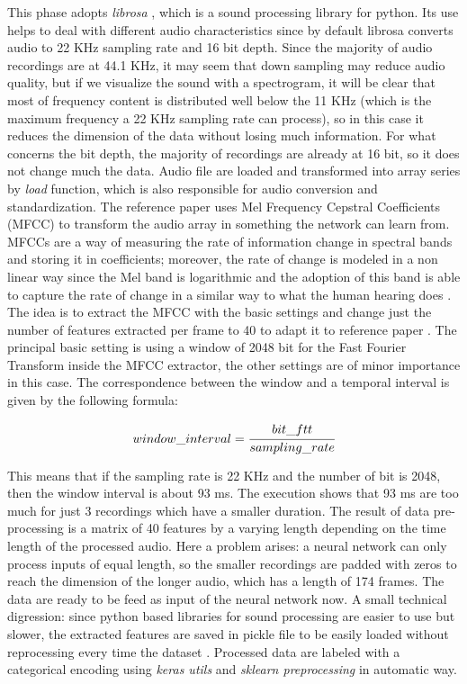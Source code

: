 \documentclass{article}
\begin{document}
This phase adopts \textit{librosa} \cite{mcfee2015librosa}, which is a sound processing library for python. Its use helps to deal with different audio characteristics since by default librosa converts audio to 22 KHz sampling rate and 16 bit depth. Since the majority of audio recordings are at 44.1 KHz, it may seem that down sampling may reduce audio quality, but if we visualize the sound with a spectrogram, it will be clear that most of frequency content is distributed well below the 11 KHz (which is the maximum frequency a 22 KHz sampling rate can process), so in this case it reduces the dimension of the data without losing much information. For what concerns the bit depth, the majority of recordings are already at 16 bit, so it does not change much the data. Audio file are loaded and transformed into array series by \textit{load} function, which is also responsible for audio conversion and standardization.\newline
The reference paper \cite{drossos2020sound} uses Mel Frequency Cepstral Coefficients (MFCC) to transform the audio array in something the network can learn from. MFCCs are a way of measuring the rate of information change in spectral bands and storing it in coefficients; moreover, the rate of change is modeled in a non linear way since the Mel band is logarithmic and the adoption of this band is able to capture the rate of change in a similar way to what the human hearing does \cite{MFCC}. \newline
The idea is to extract the MFCC with the basic settings and change just the number of features extracted per frame to 40 to adapt it to reference paper \cite{drossos2020sound}. The principal basic setting is using a window of 2048 bit for the Fast Fourier Transform inside the MFCC extractor, the other settings are of minor importance in this case. The correspondence between the window and a temporal interval is given by the following formula: 
 
\begin{equation} \label{eq:window_interval}
	window\_interval = \cfrac{bit\_ftt}{sampling\_rate}
\end{equation}

This means that if the sampling rate is 22 KHz and the number of bit is 2048, then the window interval is about 93 ms. The execution shows that 93 ms are too much for just 3 recordings which have a smaller duration. The result of data pre-processing is a matrix of 40 features by a varying length depending on the time length of the processed audio. Here a problem arises: a neural network can only process inputs of equal length, so the smaller recordings are padded with zeros to reach the dimension of the longer audio, which has a length of 174 frames. The data are ready to be feed as input of the neural network now.\newline
A small technical digression: since python based libraries for sound processing are easier to use but slower, the extracted features are saved in pickle file to be easily loaded without reprocessing every time the dataset \cite{pickle}.\newline
Processed data are labeled with a categorical encoding using \textit{keras utils} and \textit{sklearn preprocessing} in automatic way.
\end{document}
